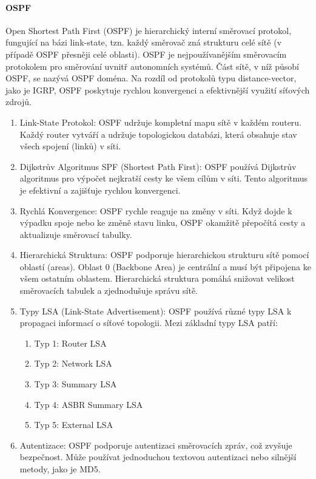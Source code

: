 \paragraph{OSPF}
Open Shortest Path First (OSPF) je hierarchický interní směrovací protokol, fungující na bázi link-state, tzn. každý směrovač zná strukturu celé sítě (v případě OSPF přesněji celé oblasti). OSPF je nejpoužívanějším směrovacím protokolem pro směrování uvnitř autonomních systémů. Část sítě, v níž působí OSPF, se nazývá OSPF doména.  Na rozdíl od protokolů typu distance-vector, jako je IGRP, OSPF poskytuje rychlou konvergenci a efektivnější využití síťových zdrojů.
\begin{enumerate}
    \item Link-State Protokol: OSPF udržuje kompletní mapu sítě v každém routeru. Každý router vytváří a udržuje topologickou databázi, která obsahuje stav všech spojení (linků) v síti.
    \item Dijkstrův Algoritmus SPF (Shortest Path First): OSPF používá Dijkstrův algoritmus pro výpočet nejkratší cesty ke všem cílům v síti. Tento algoritmus je efektivní a zajišťuje rychlou konvergenci.
    \item Rychlá Konvergence: OSPF rychle reaguje na změny v síti. Když dojde k výpadku spoje nebo ke změně stavu linku, OSPF okamžitě přepočítá cesty a aktualizuje směrovací tabulky.
    \item Hierarchická Struktura: OSPF podporuje hierarchickou strukturu sítě pomocí oblastí (areas). Oblast 0 (Backbone Area) je centrální a musí být připojena ke všem ostatním oblastem. Hierarchická struktura pomáhá snižovat velikost směrovacích tabulek a zjednodušuje správu sítě.
    \item Typy LSA (Link-State Advertisement): OSPF používá různé typy LSA k propagaci informací o síťové topologii. Mezi základní typy LSA patří: 
    \begin{enumerate}
        \item Typ 1: Router LSA
        \item Typ 2: Network LSA
        \item Typ 3: Summary LSA
        \item Typ 4: ASBR Summary LSA
        \item Typ 5: External LSA
    \end{enumerate}
    \item Autentizace: OSPF podporuje autentizaci směrovacích zpráv, což zvyšuje bezpečnost. Může používat jednoduchou textovou autentizaci nebo silnější metody, jako je MD5.

\end{enumerate}

